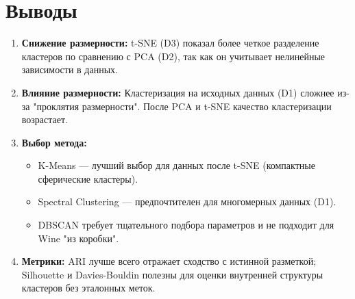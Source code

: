 \documentclass[a4paper,12pt]{article}
\begin{document}
\section*{Выводы}
\begin{enumerate}
    \item \textbf{Снижение размерности:} t-SNE (D3) показал более четкое разделение кластеров по сравнению с PCA (D2), так как он учитывает нелинейные зависимости в данных.
    \item \textbf{Влияние размерности:} Кластеризация на исходных данных (D1) сложнее из-за "проклятия размерности". После PCA и t-SNE качество кластеризации возрастает.
    \item \textbf{Выбор метода:}
    \begin{itemize}
        \item K-Means — лучший выбор для данных после t-SNE (компактные сферические кластеры).
        \item Spectral Clustering — предпочтителен для многомерных данных (D1).
        \item DBSCAN требует тщательного подбора параметров и не подходит для Wine "из коробки".
    \end{itemize}
    \item \textbf{Метрики:} ARI лучше всего отражает сходство с истинной разметкой; Silhouette и Davies-Bouldin полезны для оценки внутренней структуры кластеров без эталонных меток.
\end{enumerate}
\end{document}
